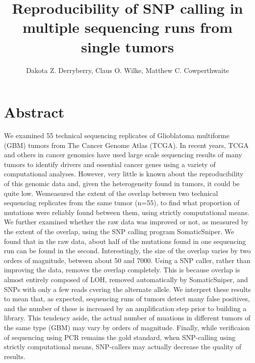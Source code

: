 \documentclass[11pt]{article} %
\title{Reproducibility of SNP calling in multiple sequencing runs from single tumors}
\author{Dakota Z. Derryberry, Claus O. Wilke, Matthew C. Cowperthwaite} %
\begin{document}
\maketitle

\section{Abstract}

We examined 55 technical sequencing replicates of Glioblatoma multiforme (GBM) tumors from The Cancer Genome Atlas (TCGA). %
In recent years, TCGA \cite{TCGA-GBM} and others in cancer genomics \cite{Parsons} have used large scale sequencing results of many tumors to identify drivers and essential cancer genes using a variety of computational analyses. However, very little is known about the reproducibility of this genomic data and, given the heterogeneity found in tumors, it could be quite low.  
Wemeasured the extent of the overlap between two technical sequencing replicates from the same tumor (n=55), to find what proportion of mutations were reliably found between them, using strictly computational means. We further examined whether the raw data was improved or not, as measured by the extent of the overlap, using the SNP calling program SomaticSniper.  
We found that in the raw data, about half of the mutations found in one sequencing run can be found in the second. Interestingly, the size of the overlap varies by two orders of magnitude, between about 50 and 7000. Using a SNP caller, rather than improving the data, removes the overlap completely. This is because overlap is almost entirely composed of LOH, removed automatically by SomaticSniper, and SNPs with only a few reads cvering the alternate allele.
We interpret these results to mean that, as expected, sequencing runs of tumors detect many false positives, and the number of these is increased by an amplification step prior to building a library. This tendency aside, the actual number of muations in different tumors of the same type (GBM) may vary by orders of magnitude. Finally, while verificaion of sequencing using PCR remains the gold standard, when SNP-calling using strictly computational means, SNP-callers may actually decrease the quality of results.
\end{document}
